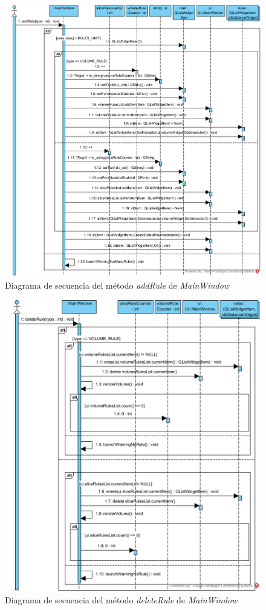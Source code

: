 \begin{figure}[H]
	\centering
	\includegraphics[width=12cm]{imagenes/diagramas/secuencia/MainWindow_AddRule}
	\caption{Diagrama de secuencia del método \textit{addRule} de \textit{MainWindow}}
	\label{fig:diagrama_secuencia_mainwindow_addrule}
\end{figure}

\begin{figure}[H]
	\centering
	\includegraphics[width=12cm]{imagenes/diagramas/secuencia/MainWindow_DeleteRule}
	\caption{Diagrama de secuencia del método \textit{deleteRule} de \textit{MainWindow}}
	\label{fig:diagrama_secuencia_mainwindow_deleterule}
\end{figure}


